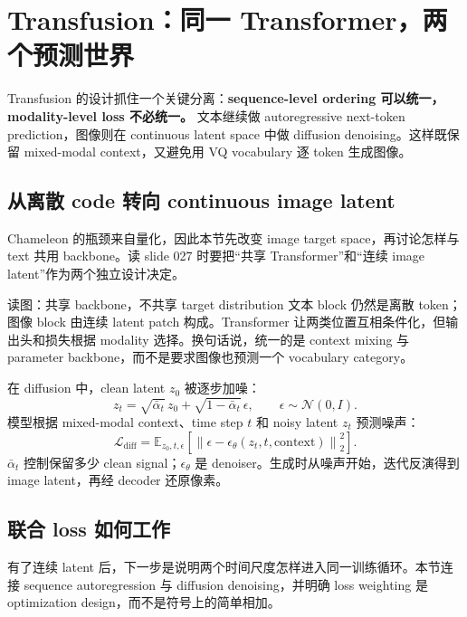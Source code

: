 \section{Transfusion：同一 Transformer，两个预测世界}

Transfusion 的设计抓住一个关键分离：\textbf{sequence-level ordering 可以统一，modality-level loss 不必统一。} 文本继续做 autoregressive next-token prediction，图像则在 continuous latent space 中做 diffusion denoising。这样既保留 mixed-modal context，又避免用 VQ vocabulary 逐 token 生成图像。

\subsection{从离散 code 转向 continuous image latent}

Chameleon 的瓶颈来自量化，因此本节先改变 image target space，再讨论怎样与 text 共用 backbone。读 slide 027 时要把“共享 Transformer”和“连续 image latent”作为两个独立设计决定。


\begin{knowledgebox}{读图：共享 backbone，不共享 target distribution}
文本 block 仍然是离散 token；图像 block 由连续 latent patch 构成。Transformer 让两类位置互相条件化，但输出头和损失根据 modality 选择。换句话说，统一的是 context mixing 与 parameter backbone，而不是要求图像也预测一个 vocabulary category。
\end{knowledgebox}

在 diffusion 中，clean latent $z_0$ 被逐步加噪：
$$
z_t=\sqrt{\bar\alpha_t}\,z_0+\sqrt{1-\bar\alpha_t}\,\epsilon,
\qquad \epsilon\sim\mathcal{N}(0,I).
$$
模型根据 mixed-modal context、time step $t$ 和 noisy latent $z_t$ 预测噪声：
$$
\mathcal{L}_{\text{diff}}
=\mathbb{E}_{z_0,t,\epsilon}
\left[\left\|\epsilon-\epsilon_\theta(z_t,t,\text{context})\right\|_2^2\right].
$$
$\bar\alpha_t$ 控制保留多少 clean signal；$\epsilon_\theta$ 是 denoiser。生成时从噪声开始，迭代反演得到 image latent，再经 decoder 还原像素。

\subsection{联合 loss 如何工作}

有了连续 latent 后，下一步是说明两个时间尺度怎样进入同一训练循环。本节连接 sequence autoregression 与 diffusion denoising，并明确 loss weighting 是 optimization design，而不是符号上的简单相加。


